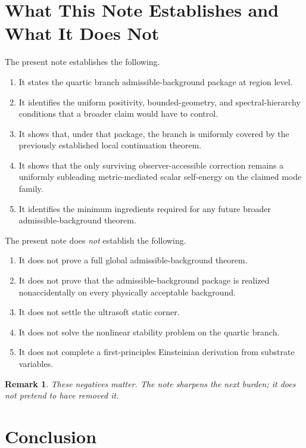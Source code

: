 \documentclass[11pt]{article}
\newtheorem{remark}{Remark}
\begin{document}
\section{What This Note Establishes and What It Does Not}

The present note establishes the following.
\begin{enumerate}
    \item It states the quartic branch admissible-background package at region level.
    \item It identifies the uniform positivity, bounded-geometry, and spectral-hierarchy conditions that a broader claim would have to control.
    \item It shows that, under that package, the branch is uniformly covered by the previously established local continuation theorem.
    \item It shows that the only surviving observer-accessible correction remains a uniformly subleading metric-mediated scalar self-energy on the claimed mode family.
    \item It identifies the minimum ingredients required for any future broader admissible-background theorem.
\end{enumerate}

The present note does \emph{not} establish the following.
\begin{enumerate}
    \item It does not prove a full global admissible-background theorem.
    \item It does not prove that the admissible-background package is realized nonaccidentally on every physically acceptable background.
    \item It does not settle the ultrasoft static corner.
    \item It does not solve the nonlinear stability problem on the quartic branch.
    \item It does not complete a first-principles Einsteinian derivation from substrate variables.
\end{enumerate}

\begin{remark}
These negatives matter. The note sharpens the next burden; it does not pretend to have removed it.
\end{remark}

\section{Conclusion}
\end{document}
